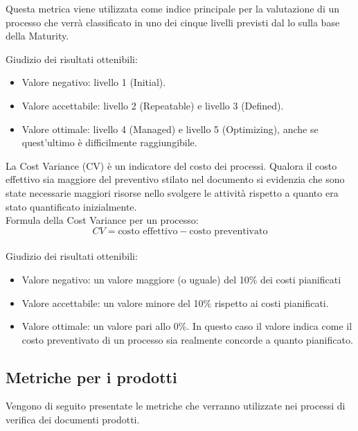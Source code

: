 \documentclass[a4paper, titlepage]{article}
\begin{document}
\label{par:cmm}
Questa metrica viene utilizzata come indice principale per la valutazione di un processo che verrà classificato in uno dei cinque livelli previsti dal lo sulla base della Maturity.
\par Giudizio dei risultati ottenibili:
\begin{itemize}
\item Valore negativo: livello 1 (Initial).
\item Valore accettabile: livello 2 (Repeatable) e livello 3 (Defined).
\item Valore ottimale: livello 4 (Managed) e livello 5 (Optimizing), anche se quest'ultimo è difficilmente raggiungibile.
\end{itemize}

\label{par:CV}
La Cost Variance (CV) è un indicatore del costo dei processi. Qualora il costo effettivo sia maggiore del preventivo stilato nel documento  si evidenzia che sono state necessarie maggiori risorse nello svolgere le attività rispetto a quanto era stato quantificato inizialmente.
\\Formula della Cost Variance per un processo:
\begin{displaymath}
CV= \mbox{costo effettivo} - \mbox{costo preventivato}
\end{displaymath}
\\ Giudizio dei risultati ottenibili:
\begin{itemize}
\item Valore negativo: un valore maggiore (o uguale) del 10\% dei costi pianificati
\item Valore accettabile: un valore minore del 10\% rispetto ai costi pianificati.
\item Valore ottimale: un valore pari allo 0\%. In questo caso il valore indica come il costo preventivato di un processo sia realmente concorde a quanto pianificato. 
\end{itemize}

\subsection{Metriche per i prodotti}

Vengono di seguito presentate le metriche che verranno utilizzate nei processi di verifica dei documenti prodotti.
\end{document}
